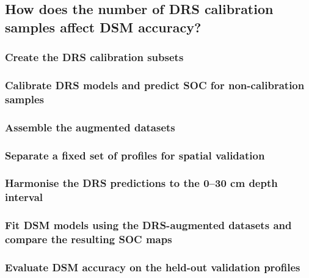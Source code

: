 \documentclass[
  10pt,
  b5paper,
  oneside]{book}
\begin{document}
\subsection{How does the number of DRS calibration samples affect DSM accuracy?}\label{how-does-the-number-of-drs-calibration-samples-affect-dsm-accuracy}

\subsubsection{Create the DRS calibration subsets}\label{create-the-drs-calibration-subsets}

\subsubsection{Calibrate DRS models and predict SOC for non-calibration samples}\label{calibrate-drs-models-and-predict-soc-for-non-calibration-samples}

\subsubsection{Assemble the augmented datasets}\label{assemble-the-augmented-datasets}

\subsubsection{Separate a fixed set of profiles for spatial validation}\label{separate-a-fixed-set-of-profiles-for-spatial-validation}

\subsubsection{Harmonise the DRS predictions to the 0--30 cm depth interval}\label{harmonise-the-drs-predictions-to-the-030-cm-depth-interval}

\subsubsection{Fit DSM models using the DRS-augmented datasets and compare the resulting SOC maps}\label{fit-dsm-models-using-the-drs-augmented-datasets-and-compare-the-resulting-soc-maps}

\subsubsection{Evaluate DSM accuracy on the held-out validation profiles}\label{evaluate-dsm-accuracy-on-the-held-out-validation-profiles}
\end{document}
